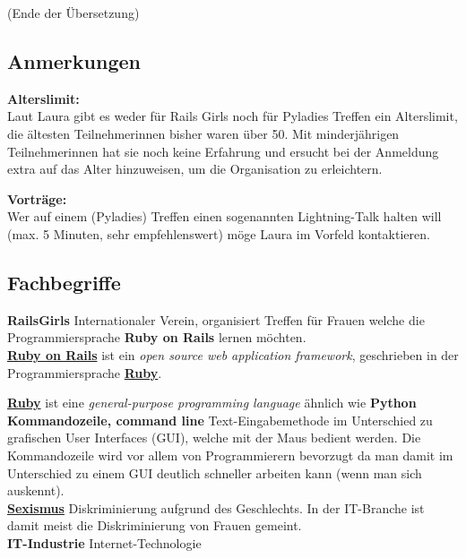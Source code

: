 \documentclass[10pt,a4paper,ngerman,twoside]{article} %
\begin{document}
(Ende der Übersetzung)

\subsection*{Anmerkungen}
\textbf{Alterslimit:} \\
Laut Laura gibt es weder für Rails Girls noch für Pyladies Treffen ein Alterslimit, die ältesten Teilnehmerinnen bisher waren über 50. Mit minderjährigen  Teilnehmerinnen hat sie noch keine Erfahrung und ersucht bei der Anmeldung extra auf das Alter hinzuweisen, um die Organisation zu erleichtern.

\textbf{Vorträge:} \\
Wer auf einem (Pyladies) Treffen einen sogenannten Lightning-Talk halten will (max. 5 Minuten, sehr empfehlenswert) möge Laura im Vorfeld kontaktieren. 


\subsection*{Fachbegriffe}

\textbf{RailsGirls} Internationaler Verein, organisiert Treffen für Frauen welche die Programmiersprache \textbf{Ruby on Rails} lernen möchten. \\

\href{https://en.wikipedia.org/wiki/Ruby_on_rails}{\textbf{Ruby on Rails}} ist ein \textit{open source web application framework}, geschrieben in der Programmiersprache \href{ruby}{\textbf{Ruby}}. 

\href{https://en.wikipedia.org/wiki/Ruby_(programming_language)}{\textbf{Ruby}} ist eine \textit{general-purpose programming language} ähnlich wie \textbf{Python} \\

\textbf{Kommandozeile, command line} Text-Eingabemethode im Unterschied zu grafischen User Interfaces (GUI), welche mit der Maus bedient werden. Die Kommandozeile wird vor allem von Programmierern bevorzugt da man damit im Unterschied zu einem GUI deutlich schneller arbeiten kann (wenn man sich auskennt). \\

\href{https://de.wikipedia.org/wiki/Sexismus}{\textbf{Sexismus}} Diskriminierung aufgrund des Geschlechts. In der IT-Branche ist damit meist die Diskriminierung von Frauen gemeint. \\

\textbf{IT-Industrie} Internet-Technologie \\
\end{document}
